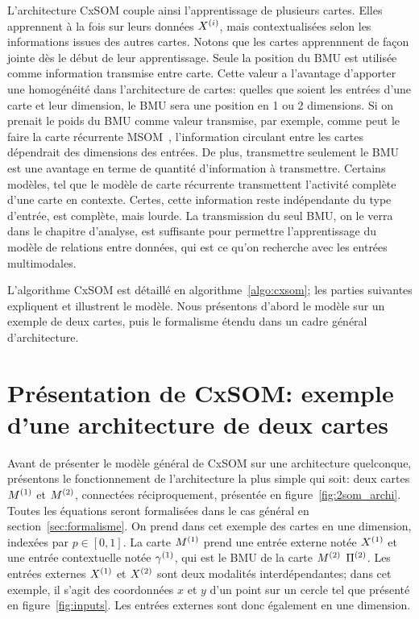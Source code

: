 L'architecture CxSOM couple ainsi l'apprentissage de plusieurs cartes. Elles apprennent à la fois sur leurs données $X^{({i})}$, mais contextualisées selon les informations issues des autres cartes. Notons que les cartes apprennnent de façon jointe dès le début de leur apprentissage. Seule la position du BMU est utilisée comme information transmise entre carte. Cette valeur a l'avantage d'apporter une homogénéité dans l'architecture de cartes: quelles que soient les entrées d'une carte et leur dimension, le BMU sera une position en 1 ou 2 dimensions. Si on prenait le poids du BMU comme valeur transmise, par exemple, comme peut le faire la carte récurrente MSOM~\cite{Strickert2005MergeSF}, l'information circulant entre les cartes dépendrait des dimensions des entrées.
De plus, transmettre seulement le BMU est une avantage en terme de quantité d'information à transmettre. Certains modèles, tel que le modèle de carte récurrente \cite{Voegtlin2002RecursiveSM} transmettent l'activité complète d'une carte en contexte. Certes, cette information reste indépendante du type d'entrée, est complète, mais lourde. La transmission du seul BMU, on le verra dans le chapitre d'analyse, est suffisante pour permettre l'apprentissage du modèle de relations entre données, qui est ce qu'on recherche avec les entrées multimodales. 

L'algorithme CxSOM est détaillé en algorithme~\ref{algo:cxsom}; les parties suivantes expliquent et illustrent le modèle. Nous présentons d'abord le modèle sur un exemple de deux cartes, puis le formalisme étendu dans un cadre général d'architecture.

\section{Présentation de CxSOM: exemple d'une architecture de deux cartes}

Avant de présenter le modèle général de CxSOM sur une architecture quelconque, présentons le fonctionnement de l'architecture la plus simple qui soit: deux cartes $M^{({1})}$ et $M^{({2})}$, connectées réciproquement, présentée en figure~\ref{fig:2som_archi}. Toutes les équations seront formalisées dans le cas général en section~\ref{sec:formalisme}.
On prend dans cet exemple des cartes en une dimension, indexées par $p \in [0,1]$.
La carte $M^{({1})}$ prend une entrée externe notée $X^{({1})}$ et une entrée contextuelle notée $\gamma^{({1})}$, qui est le BMU de la carte $M^{({2})}$ $\Pi^{({2})}$. Les entrées externes $X^{({1})}$ et $X^{({2})}$ sont deux modalités interdépendantes; dans cet exemple, il s'agit des coordonnées $x$ et $y$ d'un point sur un cercle tel que présenté en figure~\ref{fig:inputs}. Les entrées externes sont donc également en une dimension.


